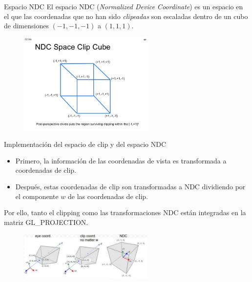 \documentclass{beamer}
\begin{document}
\begin{frame}{Espacio NDC}
  El espacio NDC (\textit{Normalized Device Coordinate}) es un espacio en el que las coordenadas que no han sido \textit{clipeadas} son escaladas dentro de un cubo de dimensiones $(-1, -1, -1)$ a $(1, 1, 1)$.

  \begin{figure}[h]
    \centering
    \includegraphics[width=0.6\textwidth]{img/ndc}
  \end{figure}
\end{frame}


\begin{frame}{Implementación del espacio de clip y del espacio NDC}
  \begin{itemize}
  \item{Primero, la información de las coordenadas de vista es transformada a coordenadas de clip.}
  \item{Después, estas coordenadas de clip son transformadas a NDC dividiendo por el componente $w$ de las coordenadas de clip.}
  \end{itemize}

  Por ello, tanto el clipping como las transformaciones NDC están integradas en la matriz GL\_PROJECTION.

  \begin{figure}[h]
    \centering
    \includegraphics[width=0.6\textwidth]{img/clipspace}
  \end{figure}
  
\end{frame}
\end{document}
